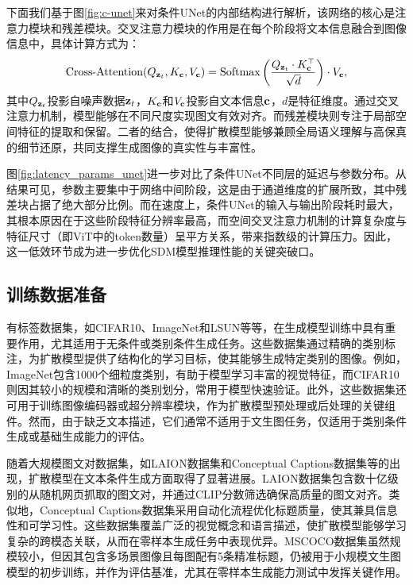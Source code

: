 \documentclass[11pt,a4paper,UTF8]{ctexart}
\begin{document}
下面我们基于图\ref{fig:c-unet}来对条件UNet的内部结构进行解析，该网络的核心是注意力模块和残差模块。交叉注意力模块的作用是在每个阶段将文本信息融合到图像信息中，具体计算方式为：
\begin{equation*}
    \text{Cross-Attention}(Q_{\mathbf{z}_t},K_{\mathbf{c}},V_{\mathbf{c}})=\text{Softmax}\left(\frac{Q_{\mathbf{z}_t}\cdot K_{\mathbf{c}}^{\top}}{\sqrt{d}}\right)\cdot V_{\mathbf{c}},
\end{equation*}
其中$Q_{\mathbf{z}_t}$投影自噪声数据$\mathbf{z}_t$，$K_{\mathbf{c}}$和$V_{\mathbf{c}}$投影自文本信息$\mathbf{c}$，$d$是特征维度。通过交叉注意力机制，模型能够在不同尺度实现图文有效对齐。而残差模块则专注于局部空间特征的提取和保留。二者的结合，使得扩散模型能够兼顾全局语义理解与高保真的细节还原，共同支撑生成图像的真实性与丰富性。

图\ref{fig:latency_params_unet}进一步对比了条件UNet不同层的延迟与参数分布。从结果可见，参数主要集中于网络中间阶段，这是由于通道维度的扩展所致，其中残差块占据了绝大部分比例。而在速度上，条件UNet的输入与输出阶段耗时最大，其根本原因在于这些阶段特征分辨率最高，而空间交叉注意力机制的计算复杂度与特征尺寸（即ViT中的token数量）呈平方关系，带来指数级的计算压力。因此，这一低效环节成为进一步优化SDM模型推理性能的关键突破口。

\subsection{训练数据准备}

有标签数据集，如CIFAR10\cite{krizhevsky2009learning}、ImageNet\cite{deng2009imagenet}和LSUN\cite{yu2015lsun}等等，在生成模型训练中具有重要作用，尤其适用于无条件或类别条件生成任务。这些数据集通过精确的类别标注，为扩散模型提供了结构化的学习目标，使其能够生成特定类别的图像。例如，ImageNet包含1000个细粒度类别，有助于模型学习丰富的视觉特征，而CIFAR10则因其较小的规模和清晰的类别划分，常用于模型快速验证。此外，这些数据集还可用于训练图像编码器或超分辨率模块\cite{rombach2022high}，作为扩散模型预处理或后处理的关键组件。然而，由于缺乏文本描述，它们通常不适用于文生图任务，仅适用于类别条件生成或基础生成能力的评估。

随着大规模图文对数据集，如LAION数据集\cite{schuhmann2021laion}和Conceptual Captions数据集\cite{sharma2018conceptual,changpinyo2021conceptual}等的出现，扩散模型在文本条件生成方面取得了显著进展。LAION数据集包含数十亿级别的从随机网页抓取的图文对，并通过CLIP分数筛选确保高质量的图文对齐。类似地，Conceptual Captions数据集采用自动化流程优化标题质量，使其兼具信息性和可学习性。这些数据集覆盖广泛的视觉概念和语言描述，使扩散模型能够学习复杂的跨模态关联，从而在零样本生成任务中表现优异。MSCOCO数据集\cite{lin2014microsoft}虽然规模较小，但因其包含多场景图像且每图配有5条精准标题，仍被用于小规模文生图模型的初步训练，并作为评估基准，尤其在零样本生成能力测试中发挥关键作用。
\end{document}
